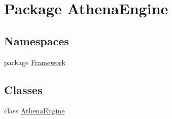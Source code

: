 \hypertarget{namespace_athena_engine}{\section{Package Athena\-Engine}
\label{namespace_athena_engine}
}
\subsection*{Namespaces}
\begin{DoxyCompactItemize}
\item 
package \hyperlink{namespace_athena_engine_1_1_framework}{Framework}
\end{DoxyCompactItemize}
\subsection*{Classes}
\begin{DoxyCompactItemize}
\item 
class \hyperlink{class_athena_engine_1_1_athena_engine}{Athena\-Engine}
\end{DoxyCompactItemize}
